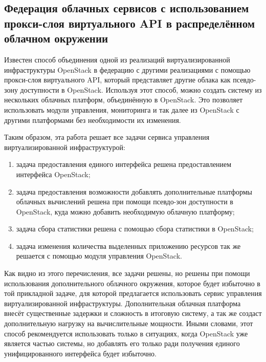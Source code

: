 \subsection{Федерация облачных сервисов с использованием прокси-слоя виртуального API в распределённом облачном окружении}
Известен способ объединения одной из реализаций виртуализированной инфраструктуры OpenStack в федерацию с другими реализациями с помощью прокси-слоя виртуального API, который представляет другие облака как псевдо-зону доступности в OpenStack\cite{federated-cloud-services}.
Используя этот способ, можно создать систему из нескольких облачных платформ, объединённую в OpenStack. Это позволяет использовать модули управления, мониторинга и так далее из OpenStack с другими платформами без необходимости их изменения.

Таким образом, эта работа решает все задачи сервиса управления виртуализированной инфраструктурой:
\begin{enumerate}
    \item задача предоставления единого интерфейса решена предоставлением интерфейса OpenStack;
    \item задача предоставления возможности добавлять дополнительные платформы облачных вычислений решена при помощи псевдо-зон доступности в OpenStack, куда можно добавить необходимую облачную платформу;
    \item задача сбора статистики решена с помощью сбора статистики в OpenStack;
    \item задача изменения количества выделенных приложению ресурсов так же решается с помощью модуля управления OpenStack.
\end{enumerate}
Как видно из этого перечисления, все задачи решены, но решены при помощи использования дополнительного облачного окружения, которое будет избыточно в той прикладной задаче, для которой предлагается использовать сервис управления виртуализированной инфраструктуры.
Дополнительная облачная платформа внесёт существенные задержки и сложность в итоговую систему, а так же создаст дополнительную нагрузку на вычислительные мощности.
Иными словами, этот способ рекомендуется использовать только в ситуациях, когда OpenStack уже является частью системы, но добавлять его только ради получения единого унифицированного интерфейса будет избыточно.